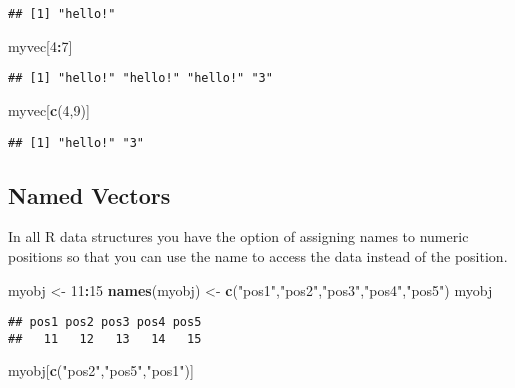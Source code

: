 \documentclass[
]{book}
\newenvironment{Shaded}{\begin{snugshade}}{\end{snugshade}}
\newcommand{\DecValTok}[1]{\textcolor[rgb]{0.00,0.00,0.81}{#1}}
\newcommand{\FunctionTok}[1]{\textcolor[rgb]{0.13,0.29,0.53}{\textbf{#1}}}
\newcommand{\NormalTok}[1]{#1}
\newcommand{\OtherTok}[1]{\textcolor[rgb]{0.56,0.35,0.01}{#1}}
\newcommand{\SpecialCharTok}[1]{\textcolor[rgb]{0.81,0.36,0.00}{\textbf{#1}}}
\newcommand{\StringTok}[1]{\textcolor[rgb]{0.31,0.60,0.02}{#1}}
\begin{document}
\begin{verbatim}
## [1] "hello!"
\end{verbatim}

\begin{Shaded}
\begin{Highlighting}[]
\NormalTok{myvec[}\DecValTok{4}\SpecialCharTok{:}\DecValTok{7}\NormalTok{]}
\end{Highlighting}
\end{Shaded}

\begin{verbatim}
## [1] "hello!" "hello!" "hello!" "3"
\end{verbatim}

\begin{Shaded}
\begin{Highlighting}[]
\NormalTok{myvec[}\FunctionTok{c}\NormalTok{(}\DecValTok{4}\NormalTok{,}\DecValTok{9}\NormalTok{)]}
\end{Highlighting}
\end{Shaded}

\begin{verbatim}
## [1] "hello!" "3"
\end{verbatim}

\subsection{Named Vectors}\label{named-vectors}

In all R data structures you have the option of assigning names to numeric positions so that you can use the
name to access the data instead of the position.

\begin{Shaded}
\begin{Highlighting}[]
\NormalTok{myobj }\OtherTok{\textless{}{-}} \DecValTok{11}\SpecialCharTok{:}\DecValTok{15}
\FunctionTok{names}\NormalTok{(myobj) }\OtherTok{\textless{}{-}} \FunctionTok{c}\NormalTok{(}\StringTok{"pos1"}\NormalTok{,}\StringTok{"pos2"}\NormalTok{,}\StringTok{"pos3"}\NormalTok{,}\StringTok{"pos4"}\NormalTok{,}\StringTok{"pos5"}\NormalTok{)}
\NormalTok{myobj}
\end{Highlighting}
\end{Shaded}

\begin{verbatim}
## pos1 pos2 pos3 pos4 pos5 
##   11   12   13   14   15
\end{verbatim}

\begin{Shaded}
\begin{Highlighting}[]
\NormalTok{myobj[}\FunctionTok{c}\NormalTok{(}\StringTok{"pos2"}\NormalTok{,}\StringTok{"pos5"}\NormalTok{,}\StringTok{"pos1"}\NormalTok{)]}
\end{Highlighting}
\end{Shaded}
\end{document}
